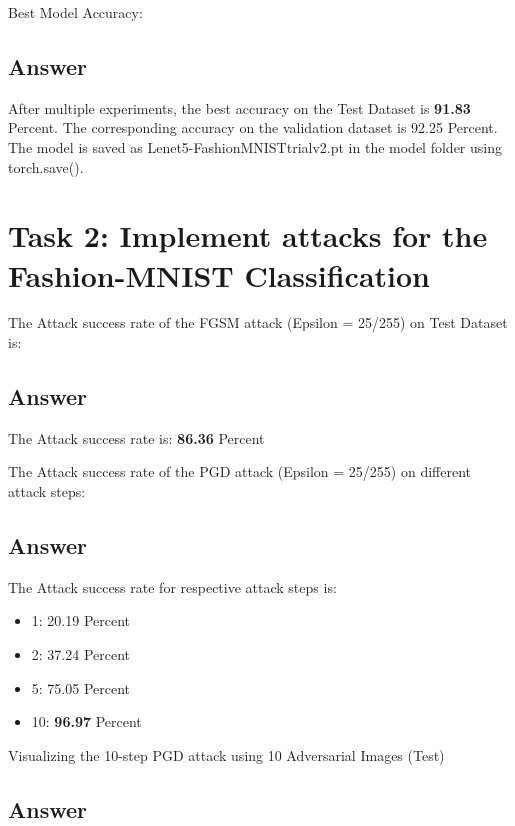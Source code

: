 \documentclass[
	12pt, %
]{fphw}
\begin{document}
\begin{problem}
	Best Model Accuracy:
\end{problem}

\subsection*{Answer}
After multiple experiments, the best accuracy on the Test Dataset is \textbf{91.83} Percent. The corresponding accuracy on the validation dataset is 92.25 Percent. The model is saved as Lenet5-FashionMNISTtrialv2.pt in the model folder using torch.save().

\section*{Task 2: Implement attacks for the Fashion-MNIST Classification}

\begin{problem}
	The Attack success rate of the FGSM attack (Epsilon = 25/255) on Test Dataset is:
\end{problem}

\subsection*{Answer}
The Attack success rate is: \textbf{86.36} Percent

\begin{problem}
	The Attack success rate of the PGD attack (Epsilon = 25/255) on different attack steps:
\end{problem}

\subsection*{Answer}
The Attack success rate for respective attack steps is:
\begin{itemize}
	\item 1: 20.19 Percent
	\item 2: 37.24 Percent
	\item 5: 75.05 Percent
	\item 10: \textbf{96.97} Percent
\end{itemize}


\begin{problem}
	Visualizing the 10-step PGD attack using 10 Adversarial Images (Test)
\end{problem}

\subsection*{Answer}
\end{document}
